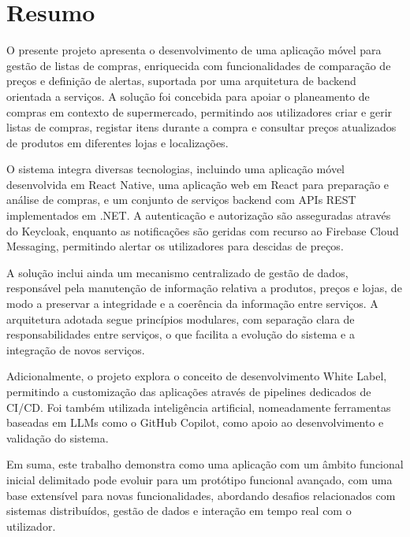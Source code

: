 \chapter{Resumo}

O presente projeto apresenta o desenvolvimento de uma aplicação móvel para gestão de listas de compras, enriquecida com funcionalidades de comparação de preços e definição de alertas, suportada por uma arquitetura de backend orientada a serviços. A solução foi concebida para apoiar o planeamento de compras em contexto de supermercado, permitindo aos utilizadores criar e gerir listas de compras, registar itens durante a compra e consultar preços atualizados de produtos em diferentes lojas e localizações.

O sistema integra diversas tecnologias, incluindo uma aplicação móvel desenvolvida em React Native, uma aplicação web em React para preparação e análise de compras, e um conjunto de serviços backend com APIs REST implementados em .NET. A autenticação e autorização são asseguradas através do Keycloak, enquanto as notificações são geridas com recurso ao Firebase Cloud Messaging, permitindo alertar os utilizadores para descidas de preços.

A solução inclui ainda um mecanismo centralizado de gestão de dados, responsável pela manutenção de informação relativa a produtos, preços e lojas, de modo a preservar a integridade e a coerência da informação entre serviços. A arquitetura adotada segue princípios modulares, com separação clara de responsabilidades entre serviços, o que facilita a evolução do sistema e a integração de novos serviços.

Adicionalmente, o projeto explora o conceito de desenvolvimento White Label, permitindo a customização das aplicações através de pipelines dedicados de CI/CD. Foi também utilizada inteligência artificial, nomeadamente ferramentas baseadas em LLMs como o GitHub Copilot, como apoio ao desenvolvimento e validação do sistema.

Em suma, este trabalho demonstra como uma aplicação com um âmbito funcional inicial delimitado pode evoluir para um protótipo funcional avançado, com uma base extensível para novas funcionalidades, abordando desafios relacionados com sistemas distribuídos, gestão de dados e interação em tempo real com o utilizador.





